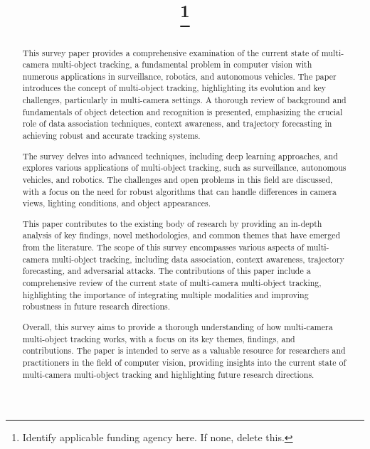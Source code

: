 \documentclass[conference]{IEEEtran}
\begin{document}
\title{
\thanks{Identify applicable funding agency here. If none, delete this.}
}

\author{
\and
{}
}

\maketitle

\begin{abstract}
This survey paper provides a comprehensive examination of the current state of multi-camera multi-object tracking, a fundamental problem in computer vision with numerous applications in surveillance, robotics, and autonomous vehicles. The paper introduces the concept of multi-object tracking, highlighting its evolution and key challenges, particularly in multi-camera settings. A thorough review of background and fundamentals of object detection and recognition is presented, emphasizing the crucial role of data association techniques, context awareness, and trajectory forecasting in achieving robust and accurate tracking systems.

The survey delves into advanced techniques, including deep learning approaches, and explores various applications of multi-object tracking, such as surveillance, autonomous vehicles, and robotics. The challenges and open problems in this field are discussed, with a focus on the need for robust algorithms that can handle differences in camera views, lighting conditions, and object appearances.

This paper contributes to the existing body of research by providing an in-depth analysis of key findings, novel methodologies, and common themes that have emerged from the literature. The scope of this survey encompasses various aspects of multi-camera multi-object tracking, including data association, context awareness, trajectory forecasting, and adversarial attacks. The contributions of this paper include a comprehensive review of the current state of multi-camera multi-object tracking, highlighting the importance of integrating multiple modalities and improving robustness in future research directions.

Overall, this survey aims to provide a thorough understanding of how multi-camera multi-object tracking works, with a focus on its key themes, findings, and contributions. The paper is intended to serve as a valuable resource for researchers and practitioners in the field of computer vision, providing insights into the current state of multi-camera multi-object tracking and highlighting future research directions.
\end{abstract}
\end{document}
